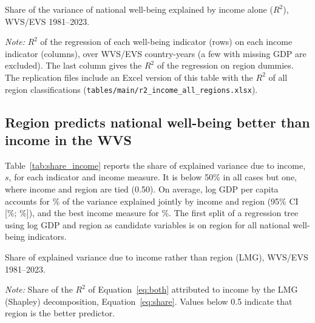 \documentclass[12pt]{article}
\begin{document}
\begin{table}[htbp]
    \centering
    \begin{adjustbox}{max width=\textwidth}
    
    \end{adjustbox}
    \caption{Share of the variance of national well-being explained by income alone ($R^2$), WVS/EVS 1981--2023.}\label{tab:r2_income}
    \begin{minipage}{\textwidth}\footnotesize \textit{Note:} $R^2$ of the regression of each well-being indicator (rows) on each income indicator (columns), over \nWVSCountryYears WVS/EVS country-years (a few with missing GDP are excluded). The last column gives the $R^2$ of the regression on region dummies. The replication files include an Excel version of this table with the $R^2$ of all region classifications (\texttt{tables/main/r2\_income\_all\_regions.xlsx}).\end{minipage}
\end{table}

\subsection{Region predicts national well-being better than income in the WVS}\label{subsec:region_wvs}

Table~\ref{tab:share_income} reports the share of explained variance due to income, $s$, for each indicator and income measure. It is below 50\% in all cases but one, where income and region are tied (0.50). On average, log GDP per capita accounts for \meanShareIncomePPP\% of the variance explained jointly by income and region (95\% CI [\ciLowWVSMeanShare\%; \ciHighWVSMeanShare\%]), and the best income measure for \meanShareIncomeBest\%. The first split of a regression tree using log GDP and region as candidate variables is on region for all national well-being indicators.

\begin{table}[htbp]
    \centering
    \begin{adjustbox}{max width=\textwidth}
    
    \end{adjustbox}
    \caption{Share of explained variance due to income rather than region (LMG), WVS/EVS 1981--2023.}\label{tab:share_income}
    \begin{minipage}{\textwidth}\footnotesize \textit{Note:} Share of the $R^2$ of Equation~\eqref{eq:both} attributed to income by the LMG (Shapley) decomposition, Equation~\eqref{eq:share}. Values below 0.5 indicate that region is the better predictor.\end{minipage}
\end{table}
\end{document}
